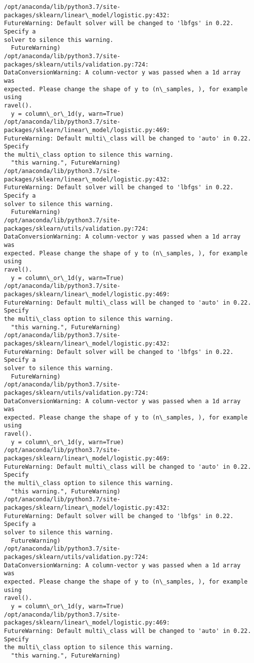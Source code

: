 \documentclass[11pt]{article}
\begin{document}
    \begin{Verbatim}[commandchars=\\\{\}]
/opt/anaconda/lib/python3.7/site-packages/sklearn/linear\_model/logistic.py:432:
FutureWarning: Default solver will be changed to 'lbfgs' in 0.22. Specify a
solver to silence this warning.
  FutureWarning)
/opt/anaconda/lib/python3.7/site-packages/sklearn/utils/validation.py:724:
DataConversionWarning: A column-vector y was passed when a 1d array was
expected. Please change the shape of y to (n\_samples, ), for example using
ravel().
  y = column\_or\_1d(y, warn=True)
/opt/anaconda/lib/python3.7/site-packages/sklearn/linear\_model/logistic.py:469:
FutureWarning: Default multi\_class will be changed to 'auto' in 0.22. Specify
the multi\_class option to silence this warning.
  "this warning.", FutureWarning)
/opt/anaconda/lib/python3.7/site-packages/sklearn/linear\_model/logistic.py:432:
FutureWarning: Default solver will be changed to 'lbfgs' in 0.22. Specify a
solver to silence this warning.
  FutureWarning)
/opt/anaconda/lib/python3.7/site-packages/sklearn/utils/validation.py:724:
DataConversionWarning: A column-vector y was passed when a 1d array was
expected. Please change the shape of y to (n\_samples, ), for example using
ravel().
  y = column\_or\_1d(y, warn=True)
/opt/anaconda/lib/python3.7/site-packages/sklearn/linear\_model/logistic.py:469:
FutureWarning: Default multi\_class will be changed to 'auto' in 0.22. Specify
the multi\_class option to silence this warning.
  "this warning.", FutureWarning)
/opt/anaconda/lib/python3.7/site-packages/sklearn/linear\_model/logistic.py:432:
FutureWarning: Default solver will be changed to 'lbfgs' in 0.22. Specify a
solver to silence this warning.
  FutureWarning)
/opt/anaconda/lib/python3.7/site-packages/sklearn/utils/validation.py:724:
DataConversionWarning: A column-vector y was passed when a 1d array was
expected. Please change the shape of y to (n\_samples, ), for example using
ravel().
  y = column\_or\_1d(y, warn=True)
/opt/anaconda/lib/python3.7/site-packages/sklearn/linear\_model/logistic.py:469:
FutureWarning: Default multi\_class will be changed to 'auto' in 0.22. Specify
the multi\_class option to silence this warning.
  "this warning.", FutureWarning)
/opt/anaconda/lib/python3.7/site-packages/sklearn/linear\_model/logistic.py:432:
FutureWarning: Default solver will be changed to 'lbfgs' in 0.22. Specify a
solver to silence this warning.
  FutureWarning)
/opt/anaconda/lib/python3.7/site-packages/sklearn/utils/validation.py:724:
DataConversionWarning: A column-vector y was passed when a 1d array was
expected. Please change the shape of y to (n\_samples, ), for example using
ravel().
  y = column\_or\_1d(y, warn=True)
/opt/anaconda/lib/python3.7/site-packages/sklearn/linear\_model/logistic.py:469:
FutureWarning: Default multi\_class will be changed to 'auto' in 0.22. Specify
the multi\_class option to silence this warning.
  "this warning.", FutureWarning)
    \end{Verbatim}
\end{document}
